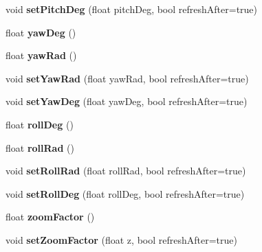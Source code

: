 \begin{DoxyCompactItemize}
\item 
\hypertarget{class_cube_map_preview_a6d4818bc2d84c853447a41919be6bf7d}{
void {\bfseries set\-Pitch\-Deg} (float pitch\-Deg, bool refresh\-After=true)}
\label{class_cube_map_preview_a6d4818bc2d84c853447a41919be6bf7d}

\item 
\hypertarget{class_cube_map_preview_a0ceb146902b4b451e3c54b34cec2811a}{
float {\bfseries yaw\-Deg} ()}
\label{class_cube_map_preview_a0ceb146902b4b451e3c54b34cec2811a}

\item 
\hypertarget{class_cube_map_preview_aa1b417a55f680acc8a2d46337540a9f2}{
float {\bfseries yaw\-Rad} ()}
\label{class_cube_map_preview_aa1b417a55f680acc8a2d46337540a9f2}

\item 
\hypertarget{class_cube_map_preview_ace266574610f6ce6670869f7436a02bd}{
void {\bfseries set\-Yaw\-Rad} (float yaw\-Rad, bool refresh\-After=true)}
\label{class_cube_map_preview_ace266574610f6ce6670869f7436a02bd}

\item 
\hypertarget{class_cube_map_preview_aae7ab4a52ddca15151afbefa0211a0cd}{
void {\bfseries set\-Yaw\-Deg} (float yaw\-Deg, bool refresh\-After=true)}
\label{class_cube_map_preview_aae7ab4a52ddca15151afbefa0211a0cd}

\item 
\hypertarget{class_cube_map_preview_ade5b5c7ba47d4bf9d702b8ad874c4428}{
float {\bfseries roll\-Deg} ()}
\label{class_cube_map_preview_ade5b5c7ba47d4bf9d702b8ad874c4428}

\item 
\hypertarget{class_cube_map_preview_ad1e9bb1668dacff95f8ad2f4573597bd}{
float {\bfseries roll\-Rad} ()}
\label{class_cube_map_preview_ad1e9bb1668dacff95f8ad2f4573597bd}

\item 
\hypertarget{class_cube_map_preview_ad8e666e2508a2d7cad3cf2695ca21664}{
void {\bfseries set\-Roll\-Rad} (float roll\-Rad, bool refresh\-After=true)}
\label{class_cube_map_preview_ad8e666e2508a2d7cad3cf2695ca21664}

\item 
\hypertarget{class_cube_map_preview_a6476ee0bb7ada9e41bfab14c30600190}{
void {\bfseries set\-Roll\-Deg} (float roll\-Deg, bool refresh\-After=true)}
\label{class_cube_map_preview_a6476ee0bb7ada9e41bfab14c30600190}

\item 
\hypertarget{class_cube_map_preview_a7d018d57e3371dd7702cb09f1c267189}{
float {\bfseries zoom\-Factor} ()}
\label{class_cube_map_preview_a7d018d57e3371dd7702cb09f1c267189}

\item 
\hypertarget{class_cube_map_preview_ada656e6c6246ad9d32fa3520a59edfe7}{
void {\bfseries set\-Zoom\-Factor} (float z, bool refresh\-After=true)}
\label{class_cube_map_preview_ada656e6c6246ad9d32fa3520a59edfe7}

\end{DoxyCompactItemize}

